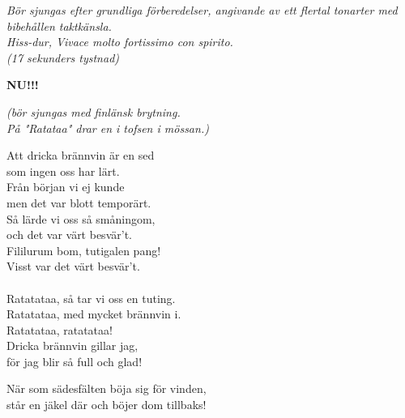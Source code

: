 \documentclass[a6paper,10pt]{article}
\begin{document}
\setlength{\oddsidemargin}{-0.47in}
\noindent
\begin{center}
    \textit{\small Bör sjungas efter grundliga förberedelser, angivande av ett flertal tonarter med bibehållen taktkänsla.\\ Hiss-dur, Vivace molto fortissimo con spirito.\\
(17 sekunders tystnad)}\\
\begin{lyrics}
\Large \textbf{NU!!!}
\end{lyrics}
\end{center}
\begin{center}
    \textit{\small (bör sjungas med finlänsk brytning. \\ På "Ratataa" drar en i tofsen i mössan.)}
\end{center}
\begin{lyrics}
Att dricka brännvin är en sed \\
som ingen oss har lärt. \\
Från början vi ej kunde \\
men det var blott temporärt. \\
Så lärde vi oss så småningom, \\
och det var värt besvär't. \\
Fililurum bom, tutigalen pang! \\
Visst var det värt besvär't. \\
\vspace{5pt}\\
Ratatataa, så tar vi oss en tuting. \\
Ratatataa, med mycket brännvin i. \\
Ratatataa, ratatataa! \\
Dricka brännvin gillar jag, \\
för jag blir så full och glad! 
\end{lyrics}
\begin{center}
\end{center}
\begin{lyrics}
När som sädesfälten böja sig för vinden, \\
står en jäkel där och böjer dom tillbaks! 
\end{lyrics}
\end{document}
